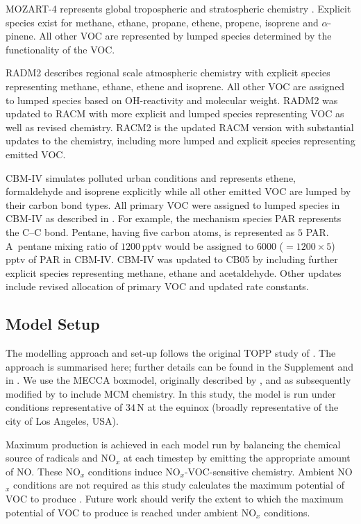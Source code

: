\documentclass[acpd, online, hvmath]{copernicus}
\begin{document}
MOZART-4 represents global tropospheric and stratospheric chemistry
\citep{Emmons:2010}.  Explicit species exist for methane, ethane,
propane, ethene, propene, isoprene and $\alpha$-pinene.  All other VOC
are represented by lumped species determined by the functionality of
the VOC.

RADM2 \citep{Stockwell:1990} describes regional scale atmospheric
chemistry with explicit species representing methane, ethane, ethene
and isoprene.  All other VOC are assigned to lumped species based on
OH-reactivity and molecular weight.  RADM2 was updated to RACM
\citep{Stockwell:1997} with more explicit and lumped species
representing VOC as well as revised chemistry.  RACM2 is the updated
RACM version \citep{Goliff:2013} with substantial updates to the
chemistry, including more lumped and explicit species representing
emitted VOC.

CBM-IV \citep{Gery:1989} simulates polluted urban conditions and
represents ethene, formaldehyde and isoprene explicitly while all
other emitted VOC are lumped by their carbon bond types.  All primary
VOC were assigned to lumped species in CBM-IV as described in
\citet{Hogo:1989}.  For example, the mechanism species PAR represents
the C--C bond.  Pentane, having five carbon atoms, is represented as
$5$ PAR.  A~pentane mixing ratio of $1200$\,\unit{pptv} would be
assigned to $6000$ ($= 1200 \times 5$)\,pptv of PAR in CBM-IV.  CBM-IV
was updated to CB05 \citep{Yarwood:2005} by including further explicit
species representing methane, ethane and acetaldehyde.  Other updates
include revised allocation of primary VOC and updated rate constants.
\subsection{Model Setup} \label{ss:model_setup} The modelling approach
and set-up follows the original TOPP study of \citet{Butler:2011}.
The approach is summarised here; further details can be found in the
Supplement and in \citet{Butler:2011}.  We use
the MECCA boxmodel, originally described by \citep{Sander:2005}, and
as subsequently modified by \citet{Butler:2011} to include MCM
chemistry.  In this study, the model is run under conditions
representative of $34${\degree}\,N at the
equinox (broadly representative of the city of Los Angeles, USA).

Maximum  production is achieved in each model run by
balancing the chemical source of radicals and NO$_{x}$ at each
timestep by emitting the appropriate amount of NO.  These NO$_{x}$
conditions induce NO$_{x}$-VOC-sensitive chemistry.  Ambient
NO$_{x}$ conditions are not required as this study calculates the
maximum potential of VOC to produce .  Future work should
verify the extent to which the maximum potential of VOC to produce
 is reached under ambient NO$_{x}$ conditions.
\end{document}
